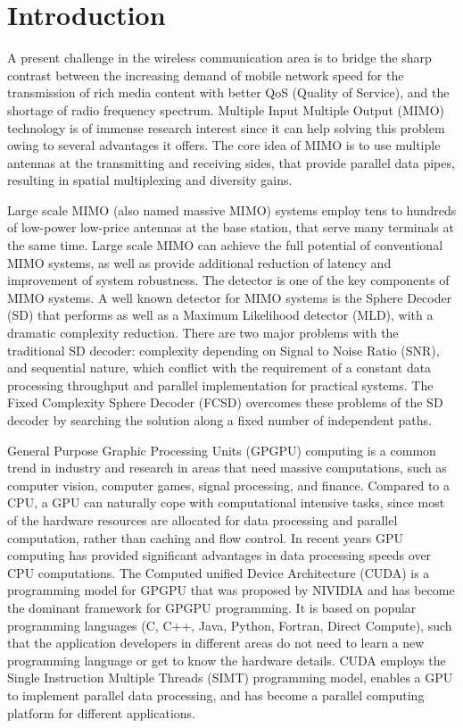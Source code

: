 \documentclass[letterpaper, 10pt, conference]{ieeeconf}
\begin{document}
\section{Introduction}
A present challenge in the wireless communication area is to bridge the sharp contrast between the increasing demand of mobile network speed for the transmission of rich media content with better QoS (Quality of Service), and the shortage of radio frequency spectrum. Multiple Input Multiple Output (MIMO) technology is of immense research interest since it can help solving this problem owing to several advantages it offers. The core idea of MIMO is to use multiple antennas at the transmitting and receiving sides, that provide parallel data pipes, resulting in spatial multiplexing and diversity gains\cite{oestges2010mimo}. 

Large scale MIMO (also named massive MIMO) systems employ tens to hundreds of low-power low-price antennas at the base station, that serve many terminals at the same time\cite{rusek2013scaling}. Large scale MIMO can achieve the full potential of conventional MIMO systems, as well as provide additional reduction of latency and improvement of system robustness. The detector is one of the key components of MIMO systems.
 A well known detector for MIMO systems is the Sphere Decoder (SD) that performs as well as a Maximum Likelihood detector (MLD), with a dramatic complexity reduction\cite{viterbo1999universal}\cite{hassibi2005sphere}. There are two major problems with the traditional SD decoder: complexity depending on Signal to Noise Ratio (SNR), and sequential nature, which conflict with the requirement of a constant data processing throughput and parallel implementation for practical systems. The Fixed Complexity Sphere Decoder (FCSD) overcomes these problems of the SD decoder by searching the solution along a fixed number of independent paths\cite{barbero2008fixing}.
 
General Purpose Graphic Processing Units (GPGPU) computing is a common trend in industry and research in areas that need massive computations, such as computer vision\cite{fung2008using}, computer games\cite{blewitt2013applicability}, signal processing\cite{van2011accelerating}\cite{6671435}, and finance\cite{grauer2013accelerating}. Compared to a CPU, a GPU can naturally cope with computational intensive tasks, since most of the hardware resources are allocated for data processing and parallel computation, rather than caching and flow control\cite{cook2013cuda}. In recent years GPU computing has provided significant advantages in data processing speeds over CPU computations\cite{nvidia2008programming}. The Computed unified Device Architecture (CUDA)\cite{cook2013cuda}\cite{nvidia2008programming} is a programming model for GPGPU that was proposed by NIVIDIA and has become the dominant framework for GPGPU programming. It is based on popular programming languages (C, C++, Java, Python, Fortran, Direct Compute), such that the application developers in different areas do not need to learn a new programming language or get to know the hardware details. CUDA employs the Single Instruction Multiple Threads (SIMT) programming model, enables a GPU to implement parallel data processing, and has become a parallel computing platform for different applications.
\end{document}
